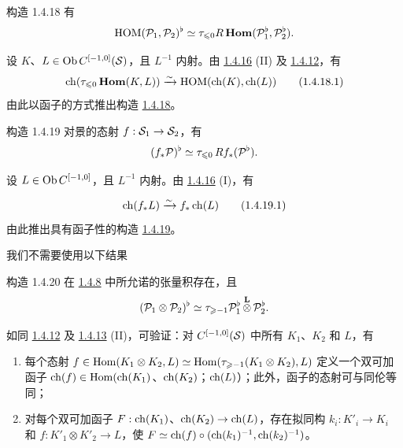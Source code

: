 \begin{enonce*}[remark]{构造 1.4.18} 有 $$
\operatorname{HOM}({\mathcal P}_{1}, {\mathcal P}_{2})^{\flat}\simeq \tau_{\leqslant
0}R\operatorname{\mathbf{Hom}} ({\mathcal P}^{\flat}_{1}, {\mathcal P}^{\flat}_{2}){}.
$$ \end{enonce*}

设 $K$、$L\in \operatorname{Ob} C^{[-1,0]}({\mathcal S})$，且 $L^{-1}$ 内射。由 \hyperref[XVIII.lem1.4.16]{1.4.16} (II) 及 \hyperref[XVIII.subsubsec1.4.12]{1.4.12}，有 \begin{equation*}
\operatorname{ch}(\tau_{\leqslant
0}\operatorname{\mathbf{Hom}}(K,L))\xrightarrow{\sim}\operatorname{HOM}(\operatorname{ch}(K),\operatorname{ch}(L))\tag{1.4.18.1}
\end{equation*} 由此以函子的方式推出构造 \hyperref[XVIII.const1.4.18]{1.4.18}。

\begin{enonce*}[remark]{构造 1.4.19} 对景的态射 $f:\Ss_{1}\to\Ss_{2}$，有 $$
(f_{\ast}{\mathcal P})^{\flat}\simeq \tau_{\leqslant
0}\,Rf_{\ast}({\mathcal P}^{\flat}){}.
$$ \end{enonce*}

设 $L\in \operatorname{Ob} C^{[-1,0]}$，且 $L^{-1}$ 内射。由 \hyperref[XVIII.lem1.4.16]{1.4.16} (I)，有

\begin{equation*}
\operatorname{ch}(f_{\ast}L)\xrightarrow{\sim} f_{\ast}\operatorname{ch}(L)\tag{1.4.19.1}
\end{equation*} 由此推出具有函子性的构造 \hyperref[XVIII.const1.4.19]{1.4.19}。

我们不需要使用以下结果

\begin{enonce*}[remark]{构造 1.4.20} 在 \hyperref[XVIII.subsubsec1.4.8]{1.4.8} 中所允诺的张量积存在，且 $$
({\mathcal P}_{1}\otimes {\mathcal P}_{2})^{\flat}\simeq \tau_{\geqslant
-1}{\mathcal P}^{\flat}_{1}\mathop{\otimes}^{\mathbf{L}}{\mathcal P}^{\flat}_{2}{}.
$$ \end{enonce*}

如同 \hyperref[XVIII.subsubsec1.4.12]{1.4.12} 及 \hyperref[XVIII.lem1.4.13]{1.4.13} (II)，可验证：对 $C^{[-1,0]}({\mathcal S})$ 中所有 $K_{1}$、$K_{2}$ 和 $L$，有 \begin{enumerate} \renewcommand{\theenumi}{\alph{enumi}} \renewcommand{\labelenumi}{\theenumi)} \item 每个态射 $f\in \operatorname{Hom}(K_{1}\otimes K_{2},L)\simeq
\operatorname{Hom}(\tau_{\geqslant-1}(K_{1}\otimes K_{2}),L)$ 定义一个双可加函子 $\operatorname{ch}(f)\in \operatorname{Hom}(\operatorname{ch}(K_{1})$、$\operatorname{ch}(K_{2})$；$\operatorname{ch}(L)$）；此外，函子的态射可与同伦等同；

\item 对每个双可加函子 $F:\operatorname{ch}(K_{1})$、$\operatorname{ch}(K_{2})\rightarrow \operatorname{ch}(L)$，存在拟同构 $k_{i}:K'_{i}\rightarrow K_{i}$ 和 $f:K'_{1}\otimes
K'_{2}\rightarrow L$，使 $F\simeq \operatorname{ch}(f)\circ
(\operatorname{ch}(k_{1})^{-1},\operatorname{ch}(k_{2})^{-1})$。 \end{enumerate}

